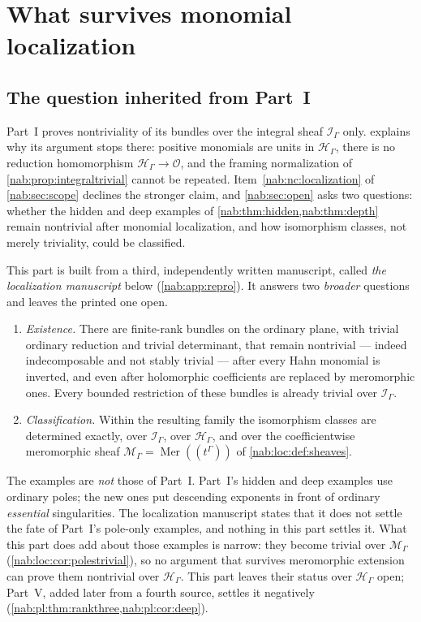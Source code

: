 \documentclass[11pt,letterpaper]{article}
\theoremstyle{definition}
\theoremstyle{remark}
\newcommand{\OO}{\mathcal O}
\newcommand{\HH}{\mathscr H_\Gamma}
\newcommand{\II}{\mathscr I_\Gamma}
\newcommand{\MM}{\mathscr M_\Gamma}
\newcommand{\Mer}{\operatorname{Mer}}
\numberwithin{equation}{section}
\begin{document}
\section{What survives monomial localization}\label{nab:loc:sec:intro}

\subsection{The question inherited from Part~I}

Part~I proves nontriviality of its bundles over the integral sheaf $\II$ only.
 explains why its argument stops there: positive
monomials are units in $\HH$, there is no reduction homomorphism $\HH\to\OO$,
and the framing normalization of \cref{nab:prop:integraltrivial} cannot be
repeated. Item~\ref{nab:nc:localization} of \cref{nab:sec:scope} declines the
stronger claim, and \cref{nab:sec:open} asks two questions: whether the hidden
and deep examples of \cref{nab:thm:hidden,nab:thm:depth} remain nontrivial
after monomial localization, and how isomorphism classes, not merely
triviality, could be classified.

This part is built from a third, independently written manuscript, called
\emph{the localization manuscript} below (\cref{nab:app:repro}). It answers
two \emph{broader} questions and leaves the printed one open.
\begin{enumerate}
\item \emph{Existence.} There are finite-rank bundles on the ordinary plane,
with trivial ordinary reduction and trivial determinant, that remain
nontrivial --- indeed indecomposable and not stably trivial --- after every
Hahn monomial is inverted, and even after holomorphic coefficients are
replaced by meromorphic ones. Every bounded restriction of these bundles is
already trivial over $\II$.
\item \emph{Classification.} Within the resulting family the isomorphism
classes are determined exactly, over $\II$, over $\HH$, and over the
coefficientwise meromorphic sheaf $\MM=\Mer((t^\Gamma))$ of
\cref{nab:loc:def:sheaves}.
\end{enumerate}
The examples are \emph{not} those of Part~I. Part~I's hidden and deep examples
use ordinary poles; the new ones put descending exponents in front of ordinary
\emph{essential} singularities. The localization manuscript states that it
does not settle the fate of Part~I's pole-only examples, and nothing in this
part settles it. What this part does add about those examples is narrow: they
become trivial over $\MM$ (\cref{nab:loc:cor:polestrivial}), so no argument
that survives meromorphic extension can prove them nontrivial over $\HH$. This
part leaves their status over $\HH$ open; Part~V, added later from a fourth
source, settles it negatively (\cref{nab:pl:thm:rankthree,nab:pl:cor:deep}).
\end{document}
